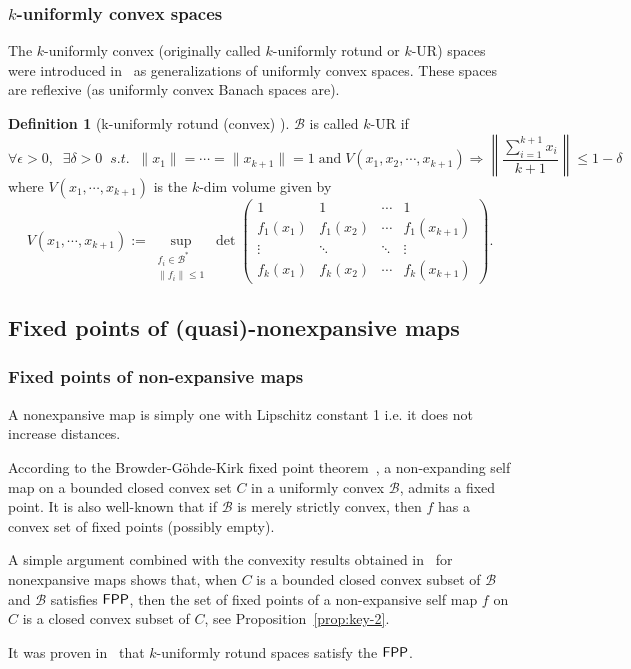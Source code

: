 \documentclass[a4, 12pt,leqno]{amsart}
\theoremstyle{plain}
\theoremstyle{definition}
\newtheorem{definition}[lemma]{Definition}
\theoremstyle{remark}
\numberwithin{equation}{section}
\newcommand{\B}{\mathcal{B}}
\begin{document}
\subsubsection{$k$-uniformly convex spaces}
\par The $k$-uniformly convex (originally called $k$-uniformly rotund or $k$-UR) spaces were introduced in~\cite{Sul} as generalizations of uniformly convex spaces. These spaces are reflexive (as uniformly convex Banach spaces are).
\begin{definition}[k-uniformly rotund (convex) \cite{Sul}]
	$\B$ is called $k$-UR if 
	\[
	\forall \epsilon >0, \;\; \exists \delta>0 \;\; s.t. \;\; \|x_1\| = \cdots = \|x_{k+1}\|=1 \; \text{and} \;  V(x_1,x_2, \cdots,x_{k+1}) \Longrightarrow \left\|\frac{\sum_{i=1}^{k+1} x_i}{k+1}\right\| \le 1 - \delta
	\]
where $V(x_1, \cdots, x_{k+1})$ is the $k$-dim volume given by
\[
V(x_1, \cdots, x_{k+1}) := \sup_{\substack{f_i \in \B^* \\ \|f_i\| \le 1}} \det \begin{pmatrix} 1 & 1 & \cdots & 1 \\ f_1(x_1) & f_1(x_2) & \cdots & f_1(x_{k+1}) \\ \vdots & \ddots & \ddots & \vdots\\ f_k(x_1) &  f_k(x_2)& \cdots& f_k(x_{k+1}) \end{pmatrix}.
\]
\end{definition}

\subsection{Fixed points of (quasi)-nonexpansive maps}\label{subsec:qne}
\subsubsection{Fixed points of non-expansive maps}
\par A nonexpansive map is simply one with Lipschitz constant 1 i.e. it does not increase distances. 
\par According to the Browder-G\"ohde-Kirk fixed point theorem~\cite{Edel}, a non-expanding self map on a bounded closed convex set $C$ in a uniformly convex $\B$, admits a fixed point. It is also well-known that if $\B$ is merely strictly convex, then $f$ has a convex set of fixed points (possibly empty).   
\par A simple argument combined with the convexity results obtained in~\cite{Bruck} for nonexpansive maps shows that, when $C$ is a bounded closed convex subset of $\B$ and $\B$ satisfies ${\sf FPP}$, then the set of fixed points of a non-expansive self map $f$ on $C$ is a closed convex subset of $C$, see Proposition~\ref{prop:key-2}.
\par  It was proven in~\cite{MY} that $k$-uniformly rotund spaces satisfy the ${\sf FPP}$.
\end{document}
